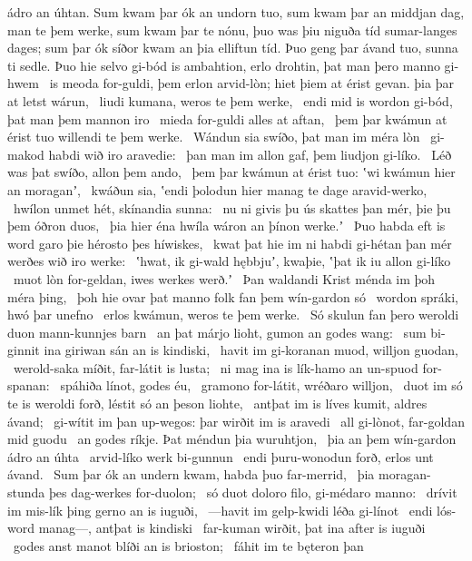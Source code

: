 ádro an úhtan. Sum kwam þar ók an undorn tuo,
sum kwam þar an middjan dag, man te þem werke,
sum kwam þar te nónu, þuo was þiu niguða tíd
sumar-langes dages; sum þar ók síðor kwam
an þia elliftun tíd. Þuo geng þar ávand tuo,
sunna ti sedle. Þuo hie selvo gi-bód
is ambahtion, erlo drohtin,
þat man þero manno gi-hwem \hld\ is meoda for-guldi,
þem erlon arvid-lòn; hiet þiem at érist gevan.
þia þar at letst wárun, \hld\ liudi kumana,
weros te þem werke, \hld\ endi mid is wordon gi-bód,
þat man þem mannon iro \hld\ mieda for-guldi
alles at aftan, \hld\ þem þar kwámun at érist tuo
willendi te þem werke. \hld\ Wándun sia swíðo,
þat man im méra lòn \hld\ gi-makod habdi
wið iro aravedie: \hld\ þan man im allon gaf,
þem liudjon gi-líko. \hld\ Léð was þat swíðo,
allon þem ando, \hld\ þem þar kwámun at érist tuo:
ʽwi kwámun hier an moraganʼ, \hld\ kwáðun sia, ʽendi þolodun hier manag te dage
aravid-werko, \hld\ hwílon unmet hét,
skínandia sunna: \hld\ nu ni givis þu ús skattes þan mér,
þie þu þem óðron duos, \hld\ þia hier éna hwíla
wáron an þínon werke.ʼ \hld\ Þuo habda eft is word garo
þie hérosto þes híwiskes, \hld\ kwat þat hie im ni habdi gi-hétan þan mér
werðes wið iro werke: \hld\ ʽhwat, ik gi-wald hębbjuʼ, kwaþie,
ʽþat ik iu allon gi-líko \hld\ muot lòn for-geldan,
iwes werkes werð.ʼ \hld\ Þan waldandi Krist
ménda im þoh méra þing, \hld\ þoh hie ovar þat manno folk
fan þem wín-gardon só \hld\ wordon spráki,
hwó þar unefno \hld\ erlos kwámun,
weros te þem werke. \hld\ Só skulun fan þero weroldi duon
mann-kunnjes barn \hld\ an þat márjo lioht,
gumon an godes wang: \hld\ sum bi-ginnit ina giriwan sán
an is kindiski, \hld\ havit im gi-koranan muod,
willjon guodan, \hld\ werold-saka míðit,
far-látit is lusta; \hld\ ni mag ina is lík-hamo
an un-spuod for-spanan: \hld\ spáhiða línot,
godes éu, \hld\ gramono for-látit,
wréðaro willjon, \hld\ duot im só te is weroldi forð,
léstit só an þeson liohte, \hld\ antþat im is líves kumit,
aldres ávand; \hld\ gi-wítit im þan up-wegos:
þar wirðit im is aravedi \hld\ all gi-lònot,
far-goldan mid guodu \hld\ an godes ríkje.
Þat méndun þia wuruhtjon, \hld\ þia an þem wín-gardon
ádro an úhta \hld\ arvid-líko
werk bi-gunnun \hld\ endi þuru-wonodun forð,
erlos unt ávand. \hld\ Sum þar ók an undern kwam,
habda þuo far-merrid, \hld\ þia moragan-stunda
þes dag-werkes for-duolon; \hld\ só duot doloro filo,
gi-médaro manno: \hld\ drívit im mis-lík þing
gerno an is iuguði, \hld\ —havit im gelp-kwidi
léða gi-línot \hld\ endi lós-word manag—,
antþat is kindiski \hld\ far-kuman wirðit,
þat ina after is iuguði \hld\ godes anst manot
blíði an is brioston; \hld\ fáhit im te bęteron þan
